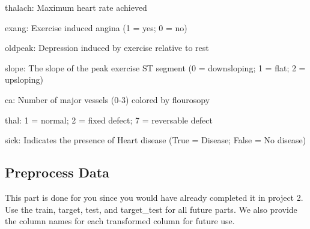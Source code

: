 \documentclass[11pt]{article}
\begin{document}
thalach: Maximum heart rate achieved

exang: Exercise induced angina (1 = yes; 0 = no)

oldpeak: Depression induced by exercise relative to rest

slope: The slope of the peak exercise ST segment (0 = downsloping; 1 =
flat; 2 = upsloping)

ca: Number of major vessels (0-3) colored by flourosopy

thal: 1 = normal; 2 = fixed defect; 7 = reversable defect

sick: Indicates the presence of Heart disease (True = Disease; False =
No disease)

    \hypertarget{preprocess-data}{%
\subsection{Preprocess Data}\label{preprocess-data}}

This part is done for you since you would have already completed it in
project 2. Use the train, target, test, and target\_test for all future
parts. We also provide the column names for each transformed column for
future use.
\end{document}
